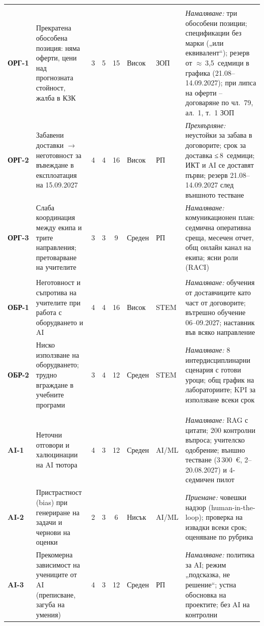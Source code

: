 \documentclass[11pt,a4paper]{article}
\begin{document}
\begin{xltabular}{\textwidth}{@{}>{\bfseries}l>{\raggedright\arraybackslash{}\hsize}X ccc >{\centering\arraybackslash}p{1.12cm}>{\raggedright\arraybackslash}p{1.05cm}>{\raggedright\arraybackslash{}\hsize}X@{}}
\\*
ОРГ-1 & Прекратена обособена позиция: няма оферти, цени над прогнозната стойност, жалба в КЗК & 3 & 5 & 15 & Висок & ЗОП & \textit{Намаляване:} три обособени позиции; спецификации без марки („или еквивалент“); резерв от $\approx$\,3,5~седмици в графика (21.08–14.09.2027); при липса на оферти – договаряне по чл.~79, ал.~1, т.~1 ЗОП\\
ОРГ-2 & Забавени доставки $\to$ неготовност за въвеждане в експлоатация на 15.09.2027 & 4 & 4 & 16 & Висок & РП & \textit{Прехвърляне:} неустойки за забава в договорите; срок за доставка ≤\,8~седмици; ИКТ и AI се доставят първи; резерв 21.08–14.09.2027 след външното тестване\\
ОРГ-3 & Слаба координация между екипа и трите направления; претоварване на учителите & 3 & 3 & 9 & Среден & РП & \textit{Намаляване:} комуникационен план: седмична оперативна среща, месечен отчет, общ онлайн канал на екипа; ясни роли (RACI)\\
\\*
ОБР-1 & Неготовност и съпротива на учителите при работа с оборудването и AI & 4 & 4 & 16 & Висок & STEM & \textit{Намаляване:} обучения от доставчиците като част от договорите; вътрешно обучение 06–09.2027; наставник във всяко направление\\
ОБР-2 & Ниско използване на оборудването; трудно вграждане в учебните програми & 3 & 4 & 12 & Среден & STEM & \textit{Намаляване:} 8 интердисциплинарни сценария с готови уроци; общ график на лабораториите; KPI за използване всеки срок\\
\\*
AI-1 & Неточни отговори и халюцинации на AI тютора & 4 & 3 & 12 & Среден & AI/ML & \textit{Намаляване:} RAG с цитати; 200 контролни въпроса; учителско одобрение; външно тестване (3\,300~€, 2–20.08.2027) и 4-седмичен пилот\\
AI-2 & Пристрастност (bias) при генериране на задачи и чернови на оценки & 2 & 3 & 6 & Нисък & AI/ML & \textit{Приемане:} човешки надзор (human-in-the-loop); проверка на извадки всеки срок; оценяване по рубрика\\
AI-3 & Прекомерна зависимост на учениците от AI (преписване, загуба на умения) & 4 & 3 & 12 & Среден & РП & \textit{Намаляване:} политика за AI; режим „подсказка, не решение“; устна обосновка на проектите; без AI на контролни\\

\end{xltabular}
\end{document}
